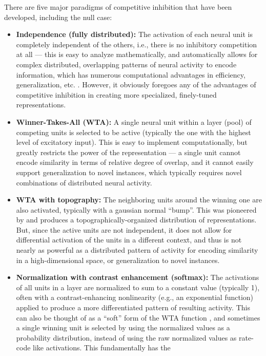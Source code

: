 \documentclass[11pt,twoside]{article}
\begin{document}
There are five major paradigms of competitive inhibition that have been
developed, including the null case:
\begin{itemize}
\item {\bf Independence (fully distributed):} The activation of each neural
  unit is completely independent of the others, i.e., there is no inhibitory
  competition at all --- this is easy to analyze mathematically, and
  automatically allows for complex distributed, overlapping patterns of neural
  activity to encode information, which has numerous computational advantages
  in efficiency, generalization, etc. \cite{RumelhartHintonWilliams86}.  However, it obviously
  foregoes any of the advantages of competitive inhibition in creating more
  specialized, finely-tuned representations.
\item {\bf Winner-Takes-All (WTA):} A single neural unit within a layer (pool)
  of competing units is selected to be active (typically the one with the
  highest level of excitatory input).  This is easy to implement
  computationally, but greatly restricts the power of the representation --- a
  single unit cannot encode similarity in terms of relative degree of overlap,
  and it cannot easily support generalization to novel instances, which
  typically requires novel combinations of distributed neural activity.
\item {\bf WTA with topography:} The neighboring units around the winning one
  are also activated, typically with a gaussian normal ``bump''.  This was
  pioneered by  and produces a topographically-organized
  distribution of representations.  But, since the active units are not
  independent, it does not allow for differential activation of the units in a
  different context, and thus is not nearly as powerful as a distributed
  pattern of activity for encoding similarity in a high-dimensional space, or
  generalization to novel instances.
\item {\bf Normalization with contrast enhancement (softmax):} The activations
  of all units in a layer are normalized to sum to a constant value (typically
  1), often with a contrast-enhancing nonlinearity (e.g., an exponential
  function) applied to produce a more differentiated pattern of resulting
  activity.  This can also be thought of as a ``soft'' form of the WTA
  function \cite{Nowlan90}, and sometimes a single winning unit is selected by using the
  normalized values as a probability distribution, instead of using the raw
  normalized values as rate-code like activations.  This fundamentally has the

\end{itemize}
\end{document}
